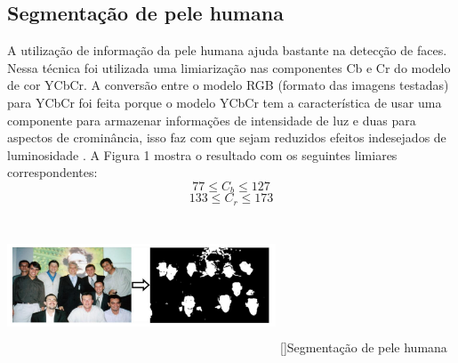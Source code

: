 \documentclass[a4paper,11pt]{article}
\newenvironment{Figure}
  {\par\medskip\noindent\minipage{\linewidth}}
    {\endminipage\par\medskip}
\begin{document}
\begin{multicols}{2}
\subsection{Segmentação de pele humana}
A utilização de informação da pele humana ajuda bastante na detecção de faces.
Nessa técnica foi utilizada uma limiarização nas componentes Cb e Cr do modelo de cor YCbCr. A conversão entre o modelo RGB (formato das imagens testadas) para YCbCr foi feita porque o modelo YCbCr tem a característica de usar uma componente para armazenar informações de intensidade de luz e duas para aspectos de crominância, isso faz com que sejam reduzidos efeitos indesejados de luminosidade \cite{ref:art2010}. A Figura 1 mostra o resultado com os seguintes limiares correspondentes:
\begin{equation}
	77 \leq C_b \leq 127
\end{equation}
\begin{equation}
	133 \leq C_r \leq 173
\end{equation}
\begin{Figure}
	\centering 
	\includegraphics[width=8cm, height=4cm]{imagem1}
	[]{Segmentação de pele humana}
	\label{medium}
\end{Figure}



\end{multicols}
\end{document}
